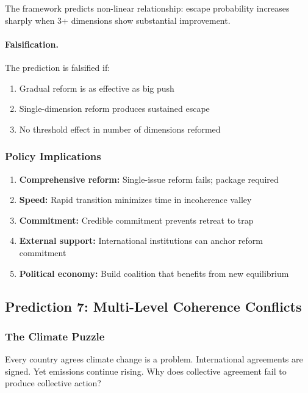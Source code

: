 The framework predicts non-linear relationship: escape probability increases 
sharply when 3+ dimensions show substantial improvement.

\paragraph{Falsification.}
The prediction is falsified if:
\begin{enumerate}
  \item Gradual reform is as effective as big push
  \item Single-dimension reform produces sustained escape
  \item No threshold effect in number of dimensions reformed
\end{enumerate}

\subsubsection{Policy Implications}

\begin{enumerate}
  \item \textbf{Comprehensive reform:} Single-issue reform fails; package required
  \item \textbf{Speed:} Rapid transition minimizes time in incoherence valley
  \item \textbf{Commitment:} Credible commitment prevents retreat to trap
  \item \textbf{External support:} International institutions can anchor reform commitment
  \item \textbf{Political economy:} Build coalition that benefits from new equilibrium
\end{enumerate}

\subsection{Prediction 7: Multi-Level Coherence Conflicts}
\label{subsec:pred-multilevel}

\subsubsection{The Climate Puzzle}

Every country agrees climate change is a problem. International agreements 
are signed. Yet emissions continue rising. Why does collective agreement 
fail to produce collective action?

